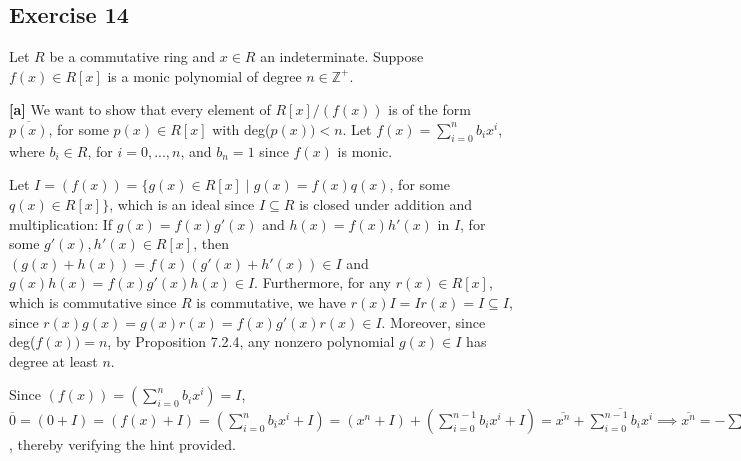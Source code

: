 \subsection*{Exercise 14}
Let $R$ be a commutative ring and $x \in R$ an indeterminate. Suppose $f(x) \in R[x]$ is a monic polynomial of degree $n \in \mathbb{Z}^+$.

\vspace{3 mm}

\textbf{[a]} We want to show that every element of $R[x]/(f(x))$ is of the form $\overline{p(x)}$, for some $p(x) \in R[x]$ with deg($p(x)) < n$. Let $f(x) = \sum_{i=0}^nb_ix^i$, where $b_i \in R$, for $i = 0,...,n$, and $b_n = 1$ since $f(x)$ is monic.

Let $I = (f(x)) = \{g(x) \in R[x] \mid g(x) = f(x)q(x)$, for some $q(x) \in R[x] \}$, which is an ideal since $I \subseteq R$ is closed under addition and multiplication: If $g(x) = f(x)g'(x)$ and $h(x) = f(x)h'(x)$ in $I$, for some $g'(x),h'(x) \in R[x]$, then $(g(x) + h(x)) = f(x)(g'(x) + h'(x)) \in I$ and $g(x)h(x) = f(x)g'(x)h(x) \in I$. Furthermore, for any $r(x) \in R[x]$, which is commutative since $R$ is commutative, we have $r(x)I = Ir(x) = I \subseteq I$, since $r(x)g(x) = g(x)r(x) = f(x)g'(x)r(x) \in I$. Moreover, since deg($f(x)) = n$, by Proposition 7.2.4, any nonzero polynomial $g(x) \in I$ has degree at least $n$.

Since $(f(x)) = (\sum_{i=0}^nb_ix^i) = I$, $\overline{0} = (0 + I) = (f(x) + I) = (\sum_{i=0}^nb_ix^i + I) = (x^n + I) + (\sum_{i=0}^{n-1}b_ix^i + I) = \overline{x^n} + \overline{\sum_{i=0}^{n-1}b_ix^i} \implies \overline{x^n} = \overline{-\sum_{i=0}^{n-1}b_ix^i}$, thereby verifying the hint provided.

